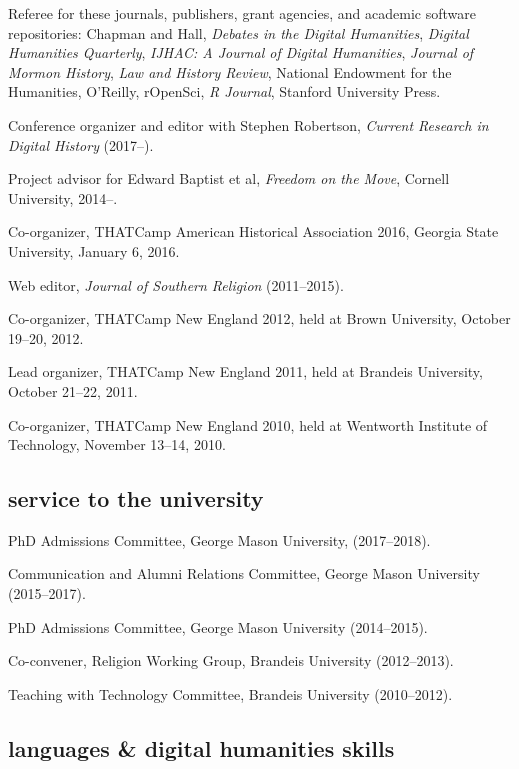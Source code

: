 \documentclass[11pt]{article}
\begin{document}
Referee for these journals, publishers, grant agencies, and academic software 
repositories: Chapman and Hall, \emph{Debates in the Digital Humanities}, 
\emph{Digital Humanities Quarterly}, \emph{IJHAC: A Journal of Digital 
  Humanities}, \emph{Journal of Mormon History}, \emph{Law and History 
  Review}, National Endowment for the Humanities, O'Reilly, rOpenSci, \emph{R Journal}, Stanford University Press.

Conference organizer and editor with Stephen Robertson, \emph{Current Research 
  in Digital History} (2017--).

Project advisor for Edward Baptist et al, \emph{Freedom on the Move}, Cornell 
University, 2014--.

Co-organizer, THATCamp American Historical Association 2016, Georgia State University, January 6, 2016.

Web editor, \emph{Journal of Southern Religion} (2011--2015).

Co-organizer, THATCamp New England 2012, held at Brown University,
October 19--20, 2012.

Lead organizer, THATCamp New England 2011, held at Brandeis University,
October 21--22, 2011.

Co-organizer, THATCamp New England 2010, held at Wentworth Institute of
Technology, November 13--14, 2010.


\subsection{service to the university}\label{service-university}

PhD Admissions Committee, George Mason University, (2017--2018).

Communication and Alumni Relations Committee, George Mason University 
(2015--2017).

PhD Admissions Committee, George Mason University (2014--2015).

Co-convener, Religion Working Group, Brandeis University (2012--2013).

Teaching with Technology Committee, Brandeis University (2010--2012).

\subsection{languages \& digital humanities
  skills}\label{languages-and-digital-humanities-skills}
\end{document}

